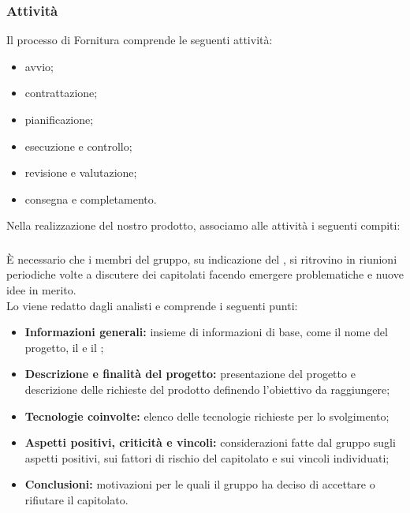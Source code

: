 \subsubsection{Attività}
Il processo di Fornitura comprende le seguenti attività:
\begin{itemize}
	\item avvio;
	\item contrattazione;
	\item pianificazione;
	\item esecuzione e controllo;
	\item revisione e valutazione;
	\item consegna e completamento.
\end{itemize}
Nella realizzazione del nostro prodotto, associamo alle attività i seguenti compiti:


\subsubsection{\SdF}
È necessario che i membri del gruppo, su indicazione del \respProg, si ritrovino in riunioni periodiche volte a discutere dei capitolati facendo emergere problematiche e nuove idee in merito.\\
Lo \SdFv{}viene redatto dagli analisti e comprende i seguenti punti:
\begin{itemize}
    \item \textbf{Informazioni generali:} insieme di informazioni di base, come il nome del progetto, il \proponProg{} e il \commitProg{};
    \item \textbf{Descrizione e finalità del progetto:} presentazione del progetto e descrizione delle richieste del prodotto definendo l'obiettivo da raggiungere;
    \item \textbf{Tecnologie coinvolte:} elenco delle tecnologie richieste per lo svolgimento;
    \item \textbf{Aspetti positivi, criticità e vincoli:} considerazioni fatte dal gruppo sugli aspetti positivi, sui fattori di rischio del capitolato e sui vincoli individuati;
    \item \textbf{Conclusioni:} motivazioni per le quali il gruppo ha deciso di accettare o rifiutare il capitolato.
\end{itemize}

